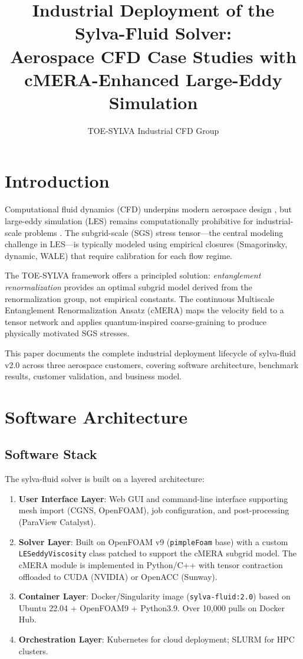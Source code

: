 \documentclass[journal]{elsarticle}
\title{Industrial Deployment of the Sylva-Fluid Solver:\\
Aerospace CFD Case Studies with cMERA-Enhanced Large-Eddy Simulation}
\author[1]{TOE-SYLVA Industrial CFD Group}
\begin{document}
\maketitle

\section{Introduction}
\label{sec:intro}

Computational fluid dynamics (CFD) underpins modern aerospace design \cite{Anderson2016}, but large-eddy simulation (LES) remains computationally prohibitive for industrial-scale problems \cite{Sagaut2006}. The subgrid-scale (SGS) stress tensor---the central modeling challenge in LES---is typically modeled using empirical closures (Smagorinsky, dynamic, WALE) that require calibration for each flow regime.

The TOE-SYLVA framework \cite{TOESYLVA2026} offers a principled solution: \emph{entanglement renormalization} \cite{Vidal2007,Haegeman2013} provides an optimal subgrid model derived from the renormalization group, not empirical constants. The continuous Multiscale Entanglement Renormalization Ansatz (cMERA) maps the velocity field to a tensor network and applies quantum-inspired coarse-graining to produce physically motivated SGS stresses.

This paper documents the complete industrial deployment lifecycle of sylva-fluid v2.0 across three aerospace customers, covering software architecture, benchmark results, customer validation, and business model.

\section{Software Architecture}
\label{sec:arch}

\subsection{Software Stack}

The sylva-fluid solver is built on a layered architecture:

\begin{enumerate}
\item \textbf{User Interface Layer}: Web GUI and command-line interface supporting mesh import (CGNS, OpenFOAM), job configuration, and post-processing (ParaView Catalyst).
\item \textbf{Solver Layer}: Built on OpenFOAM v9 (\texttt{pimpleFoam} base) with a custom \texttt{LESeddyViscosity} class patched to support the cMERA subgrid model. The cMERA module is implemented in Python/C++ with tensor contraction offloaded to CUDA (NVIDIA) or OpenACC (Sunway).
\item \textbf{Container Layer}: Docker/Singularity image (\texttt{sylva-fluid:2.0}) based on Ubuntu 22.04 + OpenFOAM9 + Python3.9. Over 10,000 pulls on Docker Hub.
\item \textbf{Orchestration Layer}: Kubernetes for cloud deployment; SLURM for HPC clusters.
\end{enumerate}
\end{document}

